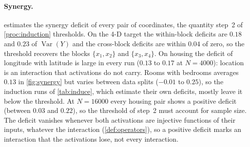 \documentclass[11pt]{article}
\theoremstyle{definition}
\theoremstyle{remark}
\newcommand{\Var}{\operatorname{Var}}
\begin{document}
\paragraph{Synergy.}
 estimates the synergy deficit of every pair of coordinates, the
quantity step~2 of \cref{proc:induction} thresholds.  On the 4-D target the within-block
deficits are $0.18$ and $0.23$ of $\Var(Y)$ and the cross-block deficits are within
$0.04$ of zero, so the threshold recovers the blocks $\{x_1,x_2\}$ and $\{x_3,x_4\}$.  On
housing the deficit of longitude with latitude is large in every run ($0.13$ to $0.17$ at
$N=4000$): location is an interaction that activations do not carry.  Rooms with bedrooms
averages $0.13$ in \cref{fig:synergy} but varies between data splits ($-0.01$ to $0.25$), so
the induction runs of \cref{tab:induce}, which estimate their own deficits, mostly leave
it below the threshold.  At $N=16000$ every housing pair shows a positive deficit (between $0.03$ and
$0.22$), so the threshold of step~2 must account for sample size.  The deficit vanishes
whenever both activations are injective functions of their inputs, whatever the
interaction (\cref{def:operators}), so a positive deficit marks an interaction that the
activations lose, not every interaction.

\begin{table}[t]
\centering\small
\resizebox{\linewidth}{!}{}
\caption{Task induction end to end (\cref{proc:induction}; three seeds, $\kappa=0.25$ for
every candidate, so the single-tree errors differ from those of \cref{tab:toys,tab:feynman},
which tune $\kappa$).  Groups formed by step~2 at threshold $\tau=0.05$ (most frequent
over seeds, each run estimating its own deficits) and test RMSE$/\mathrm{sd}$ of the
single tree, of the generic balanced forest over the inputs, of the forest selected on
validation data among the single tree, the balanced forest and the induced forests for
$\tau\in\{0.02,0.05,0.1,0.2\}$ with activation or hybrid messages, and of the best
candidate in hindsight.}
\label{tab:induce}
\end{table}
\end{document}
